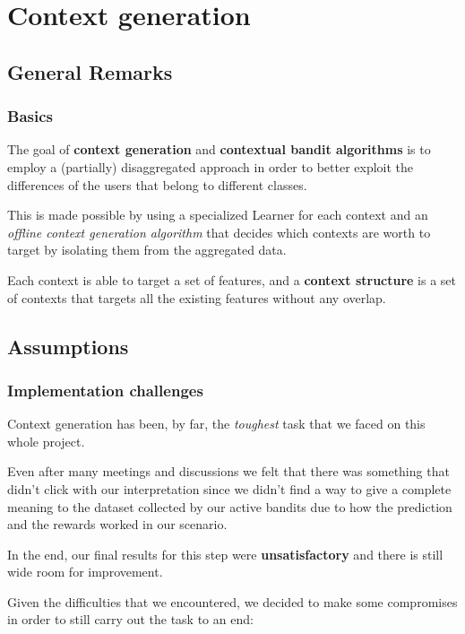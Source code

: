 \chapter{Context generation}
\label{chap:ctx_gen}

\section{General Remarks}

\subsection{Basics}

The goal of \textbf{context generation} and \textbf{contextual bandit algorithms} is to employ a (partially) disaggregated approach in order to better exploit the differences of the users that belong to different classes.

This is made possible by using a specialized Learner for each context and an \textit{offline context generation algorithm} that decides which contexts are worth to target by isolating them from the aggregated data.

Each context is able to target a set of features, and a \textbf{context structure} is a set of contexts that targets all the existing features without any overlap.

\section{Assumptions}

\subsection{Implementation challenges}

Context generation has been, by far, the \textit{toughest} task that we faced on this whole project.

Even after many meetings and discussions we felt that there was something that didn't click with our interpretation since we didn't find a way to give a complete meaning to the dataset collected by our active bandits due to how the prediction and the rewards worked in our scenario.

In the end, our final results for this step were \textbf{unsatisfactory} and there is still wide room for improvement.

Given the difficulties that we encountered, we decided to make some compromises in order to still carry out the task to an end:

